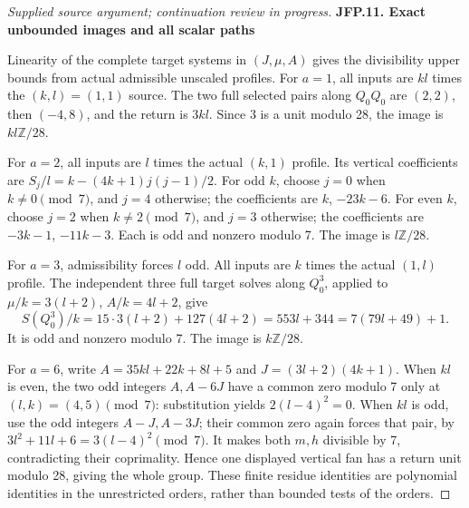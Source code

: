 \begin{proof}[Supplied source argument; continuation review in progress]
\par

\medskip\noindent\textbf{JFP.11. Exact unbounded images and all scalar paths}

\par\nobreak

Linearity of the complete target systems in \((J,\mu,A)\)
gives the divisibility upper bounds from actual admissible
unscaled profiles. For \(a=1\), all inputs are \(kl\) times
the \((k,l)=(1,1)\) source. The two full selected pairs along
\(Q_0Q_0\) are \((2,2)\), then \((-4,8)\), and the
return is \(3kl\). Since 3 is a unit modulo 28, the image is
\(kl\mathbb Z/28\).

For \(a=2\), all inputs are \(l\) times the actual \((k,1)\)
profile. Its vertical coefficients are
\(S_j/l=k-(4k+1)j(j-1)/2\). For odd \(k\), choose
\(j=0\) when \(k\ne0\pmod7\), and \(j=4\) otherwise;
the coefficients are \(k\), \(-23k-6\). For even \(k\),
choose \(j=2\) when \(k\ne2\pmod7\), and \(j=3\)
otherwise; the coefficients are \(-3k-1\), \(-11k-3\).
Each is odd and nonzero modulo 7. The image is
\(l\mathbb Z/28\).

For \(a=3\), admissibility forces \(l\) odd. All inputs
are \(k\) times the actual \((1,l)\) profile. The independent
three full target solves along \(Q_0^3\), applied to
\(\mu/k=3(l+2)\), \(A/k=4l+2\), give
\[
 S(Q_0^3)/k=15\cdot3(l+2)+127(4l+2)
 =553l+344=7(79l+49)+1.
\tag{JFP.44}
\]
It is odd and nonzero modulo 7. The image is
\(k\mathbb Z/28\).

For \(a=6\), write \(A=35kl+22k+8l+5\) and
\(J=(3l+2)(4k+1)\). When \(kl\) is even, the two odd
integers \(A,A-6J\) have a common zero modulo 7 only at
\((l,k)=(4,5)\pmod7\): substitution yields
\(2(l-4)^2=0\). When \(kl\) is odd, use the odd integers
\(A-J,A-3J\); their common zero again forces that pair,
by \(3l^2+11l+6=3(l-4)^2\pmod7\).
It makes both \(m,h\) divisible by 7, contradicting their
coprimality. Hence one displayed vertical fan has a return
unit modulo 28, giving the whole group. These finite residue
identities are polynomial identities in the unrestricted
orders, rather than bounded tests of the orders.


\end{proof}
